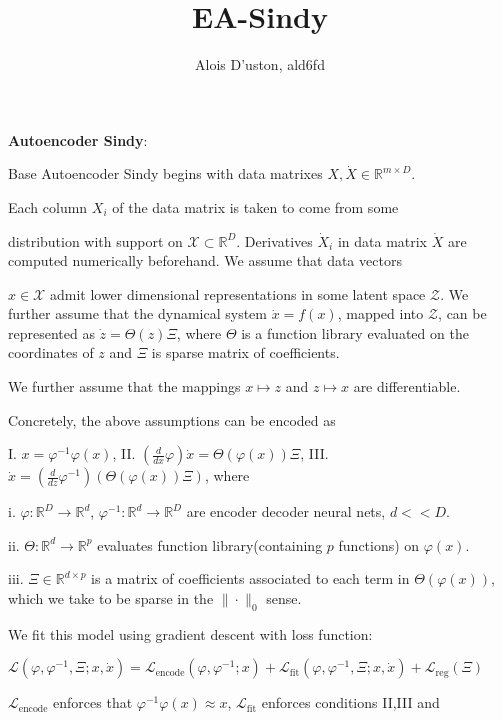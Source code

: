 \documentclass[11pt]{article}
\title{ EA-Sindy}
\author{Alois D'uston,  ald6fd}
\newcommand{\R}{\mathbb{R}}
\newcommand{\dd}[2]{\frac{d{#1}}{d{#2}}}
\newcommand{\tb}{\textbf}
\newcommand{\norm}[2]{\| #1 \|_{#2}}
\newcommand{\func}[3]{#1: #2\rightarrow#3}
\begin{document}
\maketitle


\tb{Autoencoder Sindy}:

Base Autoencoder Sindy begins with data matrixes $X,  \dot{X} \in \R^{m \times D}$. 

Each column $X_i$ of the data matrix is taken to come from some

 distribution  with support on $\mathcal{X}\subset \R^D$.  Derivatives $\dot{X}_i$ in  data matrix $\dot{X}$  are computed numerically beforehand.  
 We assume that data vectors 
 
 $x \in \mathcal{X}$ admit lower dimensional representations in some latent space  $\mathcal{Z}$.  We further assume that the dynamical system $\dot{x} = f(x)$,  mapped into  $\mathcal{Z}$, can be represented as $\dot{z} = \Theta(z)\Xi$,   where $\Theta$ is a function library evaluated on the coordinates of $z$ and $\Xi$ is sparse matrix of coefficients. 
 
  We further assume that the mappings $x \mapsto z$ and $z \mapsto x$ are differentiable. 

 Concretely,  the above assumptions can be encoded  as 
 
 
 
 I.  $x =  \varphi^{-1} \varphi(x)$, 
  II.  $(\dd{}{x}\varphi)  \dot{x} =   \Theta(\varphi(x))\Xi$,  
III. $\dot{x} = (\dd{}{z} \varphi^{-1})(\Theta(\varphi(x))\Xi)$, where 


i.  $\func{\varphi}{\R^D}{\R^d}$, $\func{\varphi^{-1}}{\R^d}{\R^D}$ are encoder decoder neural nets,  $d < < D$.

ii.  $\func{\Theta}{\R^d}{\R^p}$ evaluates function library(containing $p$ functions) on $\varphi(x)$.

iii.  $\Xi \in \R^{d \times p}$ is a matrix of   coefficients associated to each term in ${\Theta}(\varphi(x))$,  which we take to be sparse in the $\norm{\cdot}{0}$ sense.

We fit this model using gradient descent with loss function:

$\mathcal{L}(\varphi, \varphi^{-1},  \Xi ; x ,\dot{x}) = \mathcal{L}_\text{encode}(\varphi, \varphi^{-1}; x) + \mathcal{L}_\text{fit}(\varphi, \varphi^{-1},\Xi; x,\dot{x}) + \mathcal{L}_\text{reg}(\Xi)$

 $\mathcal{L}_\text{encode}$ enforces that $\varphi^{-1} \varphi(x) \approx  x$,  $\mathcal{L}_\text{fit}$ enforces conditions II,III and
\end{document}
